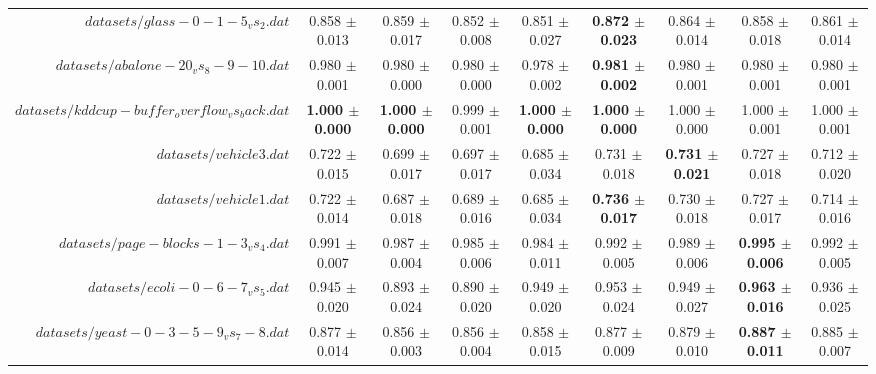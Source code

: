 \begin{table}[!ht]
{\begin{tabular}{r c c c c c c c c}
$datasets/glass-0-1-5_vs_2.dat$ & 0.858 $\pm$ 0.013 & 0.859 $\pm$ 0.017 & 0.852 $\pm$ 0.008 & 0.851 $\pm$ 0.027 & \textbf{0.872 $\pm$ 0.023} & 0.864 $\pm$ 0.014 & 0.858 $\pm$ 0.018 & 0.861 $\pm$ 0.014 \\
$datasets/abalone-20_vs_8-9-10.dat$ & 0.980 $\pm$ 0.001 & 0.980 $\pm$ 0.000 & 0.980 $\pm$ 0.000 & 0.978 $\pm$ 0.002 & \textbf{0.981 $\pm$ 0.002} & 0.980 $\pm$ 0.001 & 0.980 $\pm$ 0.001 & 0.980 $\pm$ 0.001 \\
$datasets/kddcup-buffer_overflow_vs_back.dat$ & \textbf{1.000 $\pm$ 0.000} & \textbf{1.000 $\pm$ 0.000} & 0.999 $\pm$ 0.001 & \textbf{1.000 $\pm$ 0.000} & \textbf{1.000 $\pm$ 0.000} & 1.000 $\pm$ 0.000 & 1.000 $\pm$ 0.001 & 1.000 $\pm$ 0.001 \\
$datasets/vehicle3.dat$ & 0.722 $\pm$ 0.015 & 0.699 $\pm$ 0.017 & 0.697 $\pm$ 0.017 & 0.685 $\pm$ 0.034 & 0.731 $\pm$ 0.018 & \textbf{0.731 $\pm$ 0.021} & 0.727 $\pm$ 0.018 & 0.712 $\pm$ 0.020 \\
$datasets/vehicle1.dat$ & 0.722 $\pm$ 0.014 & 0.687 $\pm$ 0.018 & 0.689 $\pm$ 0.016 & 0.685 $\pm$ 0.034 & \textbf{0.736 $\pm$ 0.017} & 0.730 $\pm$ 0.018 & 0.727 $\pm$ 0.017 & 0.714 $\pm$ 0.016 \\
$datasets/page-blocks-1-3_vs_4.dat$ & 0.991 $\pm$ 0.007 & 0.987 $\pm$ 0.004 & 0.985 $\pm$ 0.006 & 0.984 $\pm$ 0.011 & 0.992 $\pm$ 0.005 & 0.989 $\pm$ 0.006 & \textbf{0.995 $\pm$ 0.006} & 0.992 $\pm$ 0.005 \\
$datasets/ecoli-0-6-7_vs_5.dat$ & 0.945 $\pm$ 0.020 & 0.893 $\pm$ 0.024 & 0.890 $\pm$ 0.020 & 0.949 $\pm$ 0.020 & 0.953 $\pm$ 0.024 & 0.949 $\pm$ 0.027 & \textbf{0.963 $\pm$ 0.016} & 0.936 $\pm$ 0.025 \\
$datasets/yeast-0-3-5-9_vs_7-8.dat$ & 0.877 $\pm$ 0.014 & 0.856 $\pm$ 0.003 & 0.856 $\pm$ 0.004 & 0.858 $\pm$ 0.015 & 0.877 $\pm$ 0.009 & 0.879 $\pm$ 0.010 & \textbf{0.887 $\pm$ 0.011} & 0.885 $\pm$ 0.007 \\
\end{tabular}}
\end{table}
